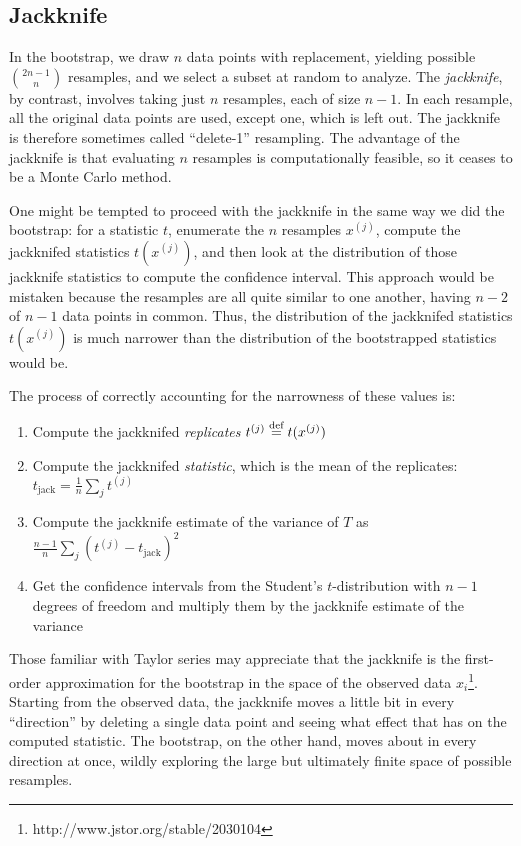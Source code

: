 \subsection{Jackknife}

In the bootstrap, we draw $n$ data points with replacement, yielding possible $\binom{2n-1}{n}$ resamples, and we select a subset at random to analyze. The \emph{jackknife}, by contrast, involves taking just $n$ resamples, each of size $n-1$. In each resample, all the original data points are used, except one, which is left out. The jackknife is therefore sometimes called ``delete-1'' resampling. The advantage of the jackknife is that evaluating $n$ resamples is computationally feasible, so it ceases to be a Monte Carlo method.

One might be tempted to proceed with the jackknife in the same way we did the bootstrap: for a statistic $t$, enumerate the $n$ resamples $x^{(j)}$, compute the jackknifed statistics $t(x^{(j)})$, and then look at the distribution of those jackknife statistics to compute the confidence interval. This approach would be mistaken because the resamples are all quite similar to one another, having $n-2$ of $n-1$ data points in common. Thus, the distribution of the jackknifed statistics $t(x^{(j)})$ is much narrower than the distribution of the bootstrapped statistics would be.

The process of correctly accounting for the narrowness of these values is:
\begin{enumerate}
  \item Compute the jackknifed \emph{replicates} $t^{(j)} \stackrel{\text{def}}{=} t(x^{(j)})$
  \item Compute the jackknifed \emph{statistic}, which is the mean of the replicates: $t_\mathrm{jack} = \tfrac{1}{n} \sum_j t^{(j)}$
  \item Compute the jackknife estimate of the variance of $T$ as $\frac{n-1}{n} \sum_j \left( t^{(j)} - t_\mathrm{jack} \right)^2$
  \item Get the confidence intervals from the Student's $t$-distribution with $n-1$ degrees of freedom and multiply them by the jackknife estimate of the variance
\end{enumerate}

Those familiar with Taylor series may appreciate that the jackknife is the first-order approximation for the bootstrap in the space of the observed data $x_i$\footnote{http://www.jstor.org/stable/2030104}. Starting from the observed data, the jackknife moves a little bit in every ``direction'' by deleting a single data point and seeing what effect that has on the computed statistic. The bootstrap, on the other hand, moves about in every direction at once, wildly exploring the large but ultimately finite space of possible resamples.


